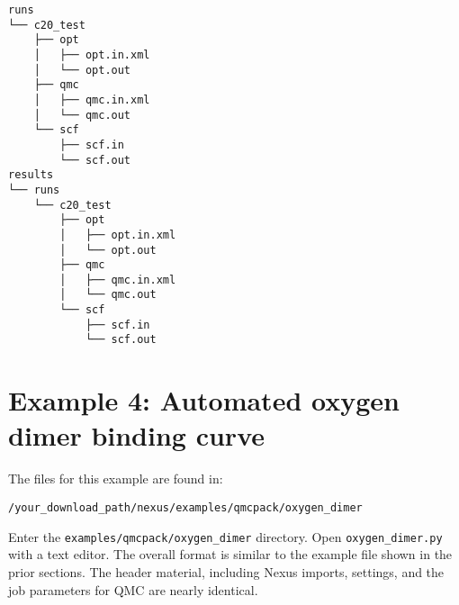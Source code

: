 \documentclass[oneside,11pt]{memoir}
\numberwithin{equation}{section}
\begin{document}
\begin{shaded}
\begin{verbatim}
runs
└── c20_test
    ├── opt
    │   ├── opt.in.xml
    │   └── opt.out
    ├── qmc
    │   ├── qmc.in.xml
    │   └── qmc.out
    └── scf
        ├── scf.in
        └── scf.out
results
└── runs
    └── c20_test
        ├── opt
        │   ├── opt.in.xml
        │   └── opt.out
        ├── qmc
        │   ├── qmc.in.xml
        │   └── qmc.out
        └── scf
            ├── scf.in
            └── scf.out
\end{verbatim}
\end{shaded}





\pagebreak
\section{Example 4: Automated oxygen dimer binding curve}
The files for this example are found in:
\begin{shaded}
\begin{verbatim}
/your_download_path/nexus/examples/qmcpack/oxygen_dimer
\end{verbatim}
\end{shaded}

Enter the \texttt{examples/qmcpack/oxygen\_dimer} directory.  Open \texttt{oxygen\_dimer.py} with a text editor.  The overall format is similar to the example file shown in the prior sections.  The header material, including Nexus imports, settings, and the job parameters for QMC are nearly identical.  
\end{document}
